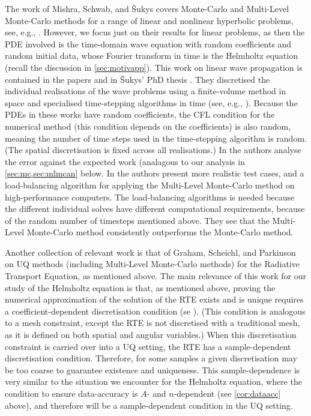 The work of Mishra, Schwab, and \v{S}ukys covers Monte-Carlo and Multi-Level Monte-Carlo methods for a range of linear and nonlinear hyperbolic problems, see, e.g., \cite{Su:14}. However, we focus just on their results for linear problems, as then the PDE involved is the time-domain wave equation with random coefficients and random initial data, whose Fourier transform in time is the Helmholtz equation (recall the discussion in \cref{sec:motivapp}). This work on linear wave propagation is contained in the papers \cite{SuMiSc:13,MiScSu:16} and in \v{S}ukys' PhD thesis \cite{Su:14}. They discretised the individual realisations of the wave problems using a finite-volume method in space and specialised time-stepping algorithms in time (see, e.g., \cite[Section 3.1]{MiScSu:16}). Because the PDEs in these works have random coefficients, the CFL condition for the numerical method (this condition depends on the coefficients) is also random, meaning the number of time steps used in the time-stepping algorithm is random. (The spatial discretisation is fixed across all realisations.) In \cite{SuMiSc:13} the authors analyse the error against the expected work (analagous to our analysis in \cref{sec:mc,sec:mlmcan} below. In \cite{MiScSu:16} the authors present more realistic test cases, and a load-balancing algorithm for applying the Multi-Level Monte-Carlo method on high-performance computers. The load-balancing algorithms is needed because the different individual solves have different computational requirements, because of the random number of timesteps mentioned above. They see that the Multi-Level Monte-Carlo method consistently outperforms the Monte-Carlo method.

Another collection of relevant work is that of Graham, Scheichl, and Parkinson \cite{GrPaSc:18,Pa:18,GrPaSc:19} on UQ methods (including Multi-Level Monte-Carlo methods) for the Radiative Transport Equation, as mentioned above. The main relevance of this work for our study of the Helmholtz equation is that, as mentioned above, proving the numerical approximation of the solution of the RTE exists and is unique requires a coefficient-dependent discretisation condition (se \cite[Theorem 4.12]{GrPaSc:19}). (This condition is analogous to a mesh constraint, except the RTE is not discretised with a traditional mesh, as it is defined on both spatial and angular variables.) When this discretisation constraint is carried over into a UQ setting, the RTE has a sample-dependent discretisation condition. Therefore, for some samples a given discretisation may be too coarse to guarantee existence and uniqueness. This sample-dependence is very similar to the situation we encounter for the Helmholtz equation, where the condition to ensure data-accuracy is $A$- and $n$-dependent (see \cref{cor:dataacc} above), and therefore will be a sample-dependent condition in the UQ setting.

